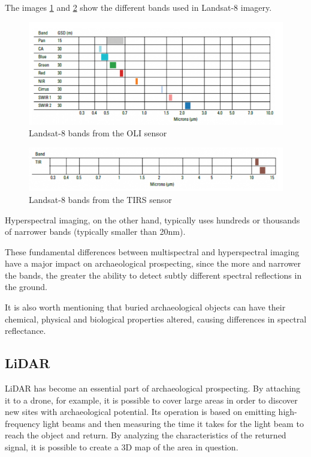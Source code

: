 The images  \ref{olisensors} and \ref{tirssensors} show the different bands used in Landsat-8 imagery.

\begin{figure}[H]
\centering
\includegraphics[width=14cm]{images/landsat1.png}
\caption[Landsat-8 bands from the OLI sensor]{Landsat-8 bands from the OLI sensor\cite{landsat}}
\label{olisensors}
\end{figure}

\begin{figure}[H]
\centering
\includegraphics[width=14cm]{images/landsat2.png}
\caption[Landsat-8 bands from the TIRS sensor]{Landsat-8 bands from the TIRS sensor\cite{landsat}}
\label{tirssensors}
\end{figure}

Hyperspectral imaging, on the other hand, typically uses hundreds or thousands of narrower bands (typically smaller than 20nm).

These fundamental differences between multispectral and hyperspectral imaging have a major impact on archaeological prospecting, since the more and narrower the bands, the greater the ability to detect subtly different spectral reflections in the ground.

It is also worth mentioning that buried archaeological objects can have their chemical, physical and biological properties altered, causing differences in spectral reflectance.


\subsection{LiDAR}
LiDAR has become an essential part of archaeological prospecting. By attaching it to a drone, for example, it is possible to cover large areas in order to discover new sites with archaeological potential.  Its operation is based on emitting high-frequency light beams and then measuring the time it takes for the light beam to reach the object and return.
By analyzing the characteristics of the returned signal, it is possible to create a 3D map of the area in question.

